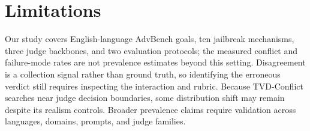 \section{Limitations}

Our study covers English-language AdvBench goals, ten jailbreak mechanisms,
three judge backbones, and two evaluation protocols; the measured conflict and
failure-mode rates are not prevalence estimates beyond this setting.
Disagreement is a collection signal rather than ground truth, so identifying
the erroneous verdict still requires inspecting the interaction and rubric.
Because \textsc{TVD}-Conflict searches near judge decision boundaries, some
distribution shift may remain despite its realism controls. Broader prevalence
claims require validation across languages, domains, prompts, and judge
families.
